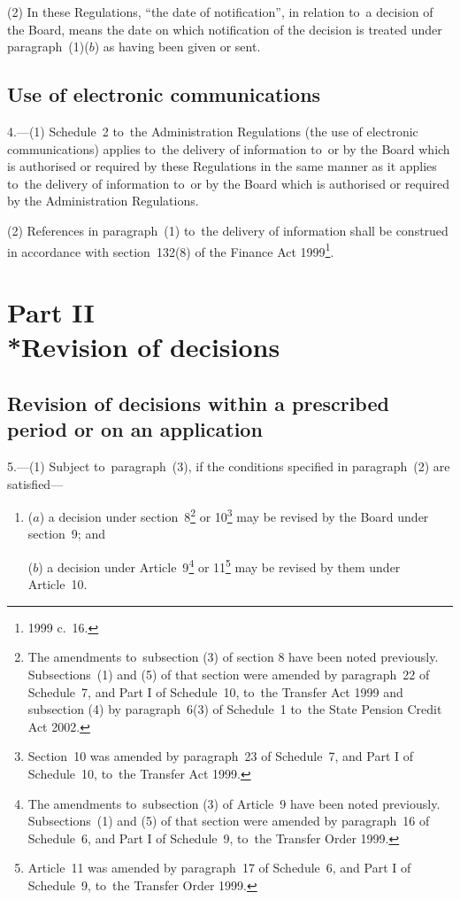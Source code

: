 \documentclass[12pt,a4paper]{article}
\begin{document}
(2) In these Regulations, “the date of notification”, in relation to~a decision of the Board, means the date on which notification of the decision is treated under paragraph~(1)($b$)  as having been given or sent.

\subsection[4. Use of electronic communications]{Use of electronic communications}

4.---(1)  Schedule~2 to~the Administration Regulations (the use of electronic communications) applies to~the delivery of information to~or by the Board which is authorised or required by these Regulations in the same manner as it applies to~the delivery of information to~or by the Board which is authorised or required by the Administration Regulations.

(2) References in paragraph~(1) to~the delivery of information shall be construed in accordance with section~132(8) of the Finance Act 1999\footnote{1999 c.~16.}.

\section[Part II --- Revision of decisions]{Part II\\*Revision of decisions}

\renewcommand\parthead{--- Part II}

\subsection[5. Revision of decisions within a prescribed period or on an application]{Revision of decisions within a prescribed period or on an application}

5.---(1)  Subject to~paragraph~(3), if the conditions specified in paragraph~(2) are satisfied—
\begin{enumerate}\item[]
($a$) a decision under section~8\footnote{The amendments to~subsection (3) of section 8 have been noted previously. Subsections~(1) and (5) of that section were amended by paragraph~22 of Schedule~7, and Part I of Schedule~10, to~the Transfer Act 1999 and subsection (4) by paragraph~6(3) of Schedule~1 to~the State Pension Credit Act 2002.} or 10\footnote{Section~10 was amended by paragraph~23 of Schedule~7, and Part I of Schedule~10, to~the Transfer Act 1999.} may be revised by the Board under section~9; and

($b$) a decision under Article~9\footnote{The amendments to~subsection (3) of Article~9 have been noted previously. Subsections~(1) and (5) of that section were amended by paragraph~16 of Schedule~6, and Part I of Schedule~9, to~the Transfer Order 1999.} or 11\footnote{Article~11 was amended by paragraph~17 of Schedule~6, and Part I of Schedule~9, to~the Transfer Order 1999.} may be revised by them under Article~10.
\end{enumerate}
\end{document}
